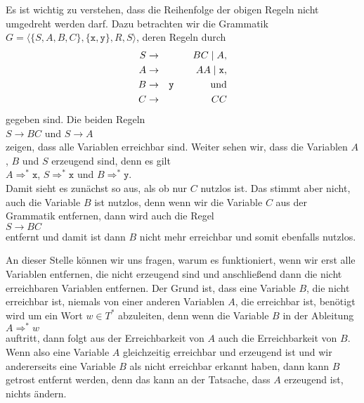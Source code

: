 Es ist wichtig zu verstehen, dass die Reihenfolge der obigen Regeln nicht umgedreht werden darf.
Dazu betrachten wir die Grammatik  $G = \langle \{S, A, B, C\}, \{ \texttt{x}, \texttt{y} \}, R, S \rangle$, deren Regeln durch
\begin{eqnarray*}
  S & \rightarrow & B C \mid A,             \\
  A & \rightarrow & A A \mid \texttt{x},    \\
  B & \rightarrow & \texttt{y} \hspace*{1.3cm} \mbox{und} \\
  C & \rightarrow & C C 
\end{eqnarray*}
gegeben sind.  Die beiden Regeln
\\[0.2cm]
\hspace*{1.3cm}
$S \rightarrow BC$ \quad und \quad $S \rightarrow A$
\\[0.2cm]
zeigen, dass alle Variablen erreichbar sind.  Weiter sehen wir, dass die Variablen $A$, $B$ und $S$
erzeugend sind, denn es gilt
\\[0.2cm]
\hspace*{1.3cm}
$A \Rightarrow^* \texttt{x}$, \quad
$S \Rightarrow^* \texttt{x}$  \quad und \quad
$B \Rightarrow^* \texttt{y}$.
\\[0.2cm]
Damit sieht es zun\"achst so aus, als ob nur $C$ nutzlos ist.  Das stimmt aber nicht, auch die Variable
$B$ ist nutzlos, denn wenn wir die Variable $C$ aus der Grammatik entfernen, dann wird auch die Regel
\\[0.2cm]
\hspace*{1.3cm}
$S \rightarrow BC$
\\[0.2cm]
entfernt und damit ist dann $B$ nicht mehr erreichbar und somit ebenfalls nutzlos.

\remark
An dieser Stelle k\"onnen wir uns fragen, warum es funktioniert, wenn wir erst alle Variablen 
entfernen, die nicht erzeugend sind und anschlie{\ss}end dann die nicht erreichbaren Variablen entfernen.
Der Grund ist, dass eine Variable $B$, die nicht erreichbar ist, niemals von einer
anderen Variablen $A$, die erreichbar ist, ben\"otigt wird um ein Wort $w\in T^*$ abzuleiten, denn
wenn die Variable $B$ in der Ableitung
\\[0.2cm]
\hspace*{1.3cm}
$A \Rightarrow^* w$
\\[0.2cm]
auftritt, dann folgt aus der Erreichbarkeit von $A$ auch die Erreichbarkeit von $B$.
Wenn also eine Variable $A$ gleichzeitig erreichbar und  erzeugend ist und wir andererseits eine Variable
$B$ als nicht erreichbar erkannt haben, dann kann $B$ getrost entfernt werden, denn das kann 
an der Tatsache, dass $A$ erzeugend ist, nichts \"andern. \eox

